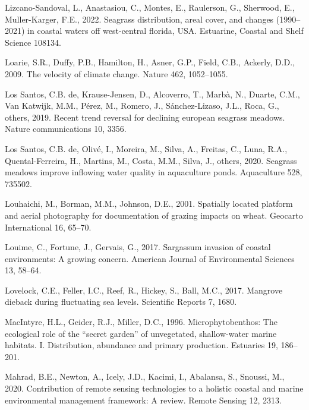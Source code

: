 \documentclass[
  letterpaper,
  11pt,
  english,
  singlespacing,
  headsepline]{MastersDoctoralThesis}
\newlength{\cslhangindent}
\newenvironment{CSLReferences}[2] %
 {\begin{list}{}{%
  \setlength{\itemindent}{0pt}
  \setlength{\leftmargin}{0pt}
  \setlength{\parsep}{0pt}
  \ifodd #1
   \setlength{\leftmargin}{\cslhangindent}
   \setlength{\itemindent}{-1\cslhangindent}
  \fi
  \setlength{\itemsep}{#2\baselineskip}}}
 {\end{list}}
\begin{document}
\begin{CSLReferences}{1}{0}
Lizcano-Sandoval, L., Anastasiou, C., Montes, E., Raulerson, G.,
Sherwood, E., Muller-Karger, F.E., 2022. Seagrass distribution, areal
cover, and changes (1990--2021) in coastal waters off west-central
florida, USA. Estuarine, Coastal and Shelf Science 108134.

Loarie, S.R., Duffy, P.B., Hamilton, H., Asner, G.P., Field, C.B.,
Ackerly, D.D., 2009. The velocity of climate change. Nature 462,
1052--1055.

Los Santos, C.B. de, Krause-Jensen, D., Alcoverro, T., Marbà, N.,
Duarte, C.M., Van Katwijk, M.M., Pérez, M., Romero, J., Sánchez-Lizaso,
J.L., Roca, G., others, 2019. Recent trend reversal for declining
european seagrass meadows. Nature communications 10, 3356.

Los Santos, C.B. de, Olivé, I., Moreira, M., Silva, A., Freitas, C.,
Luna, R.A., Quental-Ferreira, H., Martins, M., Costa, M.M., Silva, J.,
others, 2020. Seagrass meadows improve inflowing water quality in
aquaculture ponds. Aquaculture 528, 735502.

Louhaichi, M., Borman, M.M., Johnson, D.E., 2001. Spatially located
platform and aerial photography for documentation of grazing impacts on
wheat. Geocarto International 16, 65--70.

Louime, C., Fortune, J., Gervais, G., 2017. Sargassum invasion of
coastal environments: A growing concern. American Journal of
Environmental Sciences 13, 58--64.

Lovelock, C.E., Feller, I.C., Reef, R., Hickey, S., Ball, M.C., 2017.
Mangrove dieback during fluctuating sea levels. Scientific Reports 7,
1680.

MacIntyre, H.L., Geider, R.J., Miller, D.C., 1996. Microphytobenthos:
The ecological role of the {``secret garden''} of unvegetated,
shallow-water marine habitats. I. Distribution, abundance and primary
production. Estuaries 19, 186--201.

Mahrad, B.E., Newton, A., Icely, J.D., Kacimi, I., Abalansa, S.,
Snoussi, M., 2020. Contribution of remote sensing technologies to a
holistic coastal and marine environmental management framework: A
review. Remote Sensing 12, 2313.


\end{CSLReferences}
\end{document}

